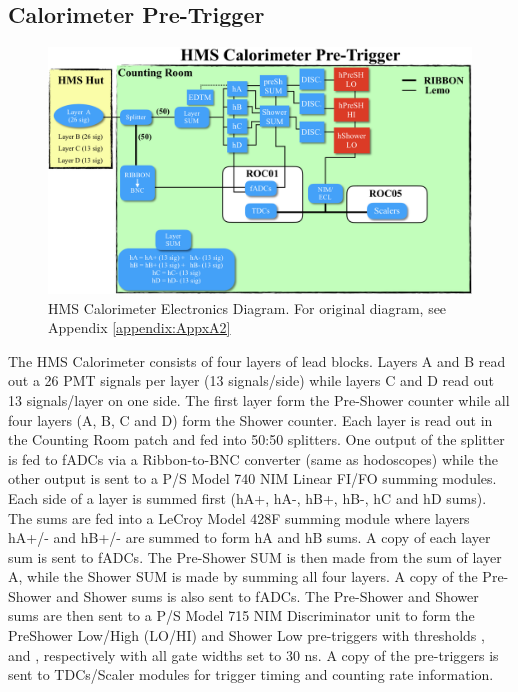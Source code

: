 \documentclass[11pt]{article}
\begin{document}
\subsection{Calorimeter Pre-Trigger}
\begin{figure}[h!]
  \centering
  \includegraphics[scale=0.5]{hCAL_diagram.png}
  \caption{HMS Calorimeter Electronics Diagram. For original diagram, see Appendix \ref{appendix:AppxA2}}
  \label{fig:hCAL_diagram}
\end{figure}
\noindent The HMS Calorimeter consists of four layers of lead blocks. Layers A and B read out a 26 PMT signals per layer (13 signals/side) while layers C and D
read out 13 signals/layer on one side. The first layer form the Pre-Shower counter while all four layers (A, B, C and D) form the Shower counter.  
Each layer is read out in the Counting Room patch and fed into 50:50 splitters. One output of the splitter is fed to fADCs via a Ribbon-to-BNC converter (same as hodoscopes)
while the other output is sent to a P/S Model 740 NIM Linear FI/FO summing modules. Each side of a layer is summed first (hA+, hA-, hB+, hB-, hC and hD sums). The sums are fed into
a LeCroy Model 428F summing module where layers hA+/- and hB+/- are summed to form hA and hB sums. A copy of each layer sum is sent to fADCs. The Pre-Shower SUM is then made from the sum of layer A, while the Shower SUM is made by summing all four layers. A copy of the Pre-Shower and Shower sums is also sent to fADCs. The Pre-Shower and Shower sums are then sent to a P/S Model 715
NIM Discriminator unit to form the PreShower Low/High (LO/HI) and Shower Low pre-triggers with thresholds \hPrShLo, \hPrShHi and \hSHLo, respectively with all gate widths set to 30 ns. A copy of the pre-triggers is sent to TDCs/Scaler modules for trigger timing and counting rate
information.
\end{document}
